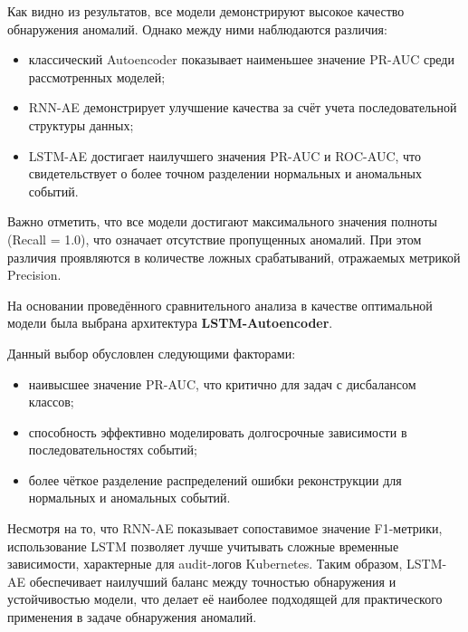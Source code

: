 Как видно из результатов, все модели демонстрируют высокое качество обнаружения аномалий. Однако между ними наблюдаются различия:

\begin{itemize}
    \item классический Autoencoder показывает наименьшее значение PR-AUC среди рассмотренных моделей;
    \item RNN-AE демонстрирует улучшение качества за счёт учета последовательной структуры данных;
    \item LSTM-AE достигает наилучшего значения PR-AUC и ROC-AUC, что свидетельствует о более точном разделении нормальных и аномальных событий.
\end{itemize}

Важно отметить, что все модели достигают максимального значения полноты (Recall = 1.0), что означает отсутствие пропущенных аномалий. При этом различия проявляются в количестве ложных срабатываний, отражаемых метрикой Precision.

На основании проведённого сравнительного анализа в качестве оптимальной модели была выбрана архитектура \textbf{LSTM-Autoencoder}.

Данный выбор обусловлен следующими факторами:
\begin{itemize}
    \item наивысшее значение PR-AUC, что критично для задач с дисбалансом классов;
    \item способность эффективно моделировать долгосрочные зависимости в последовательностях событий;
    \item более чёткое разделение распределений ошибки реконструкции для нормальных и аномальных событий.
\end{itemize}

Несмотря на то, что RNN-AE показывает сопоставимое значение F1-метрики, использование LSTM позволяет лучше учитывать сложные временные зависимости, характерные для audit-логов Kubernetes. Таким образом, LSTM-AE обеспечивает наилучший баланс между точностью обнаружения и устойчивостью модели, что делает её наиболее подходящей для практического применения в задаче обнаружения аномалий.